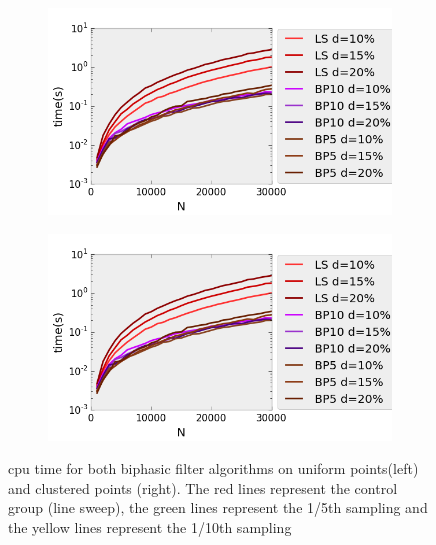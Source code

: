 \begin{figure}[H] 
  \begin{subfigure}[b]{0.5\linewidth}
    \centering
    \includegraphics[width=0.9\linewidth]{Pictures/unif_ls_bp_t} 
    \label{fig:unif_ls_bp_t} 
    \vspace{4ex}
  \end{subfigure}%
  \begin{subfigure}[b]{0.5\linewidth}
    \centering
    \includegraphics[width=0.9\linewidth]{Pictures/unif_ls_bp_t} 
    \label{fig:clus_ls_bp_t} 
    \vspace{4ex}
  \end{subfigure}
  \caption{cpu time for both biphasic filter algorithms on uniform points(left) and clustered points (right). The red lines represent the control group (line sweep), the green lines represent the 1/5th sampling and the yellow lines represent the 1/10th sampling}
  \label{fig:ls_bp_t} 
\end{figure}

